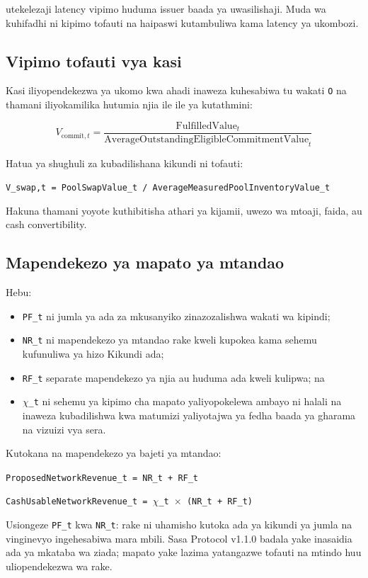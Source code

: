 \documentclass[11pt]{article}
\begin{document}
utekelezaji latency vipimo huduma issuer baada ya uwasilishaji. Muda wa kuhifadhi ni kipimo tofauti na haipaswi kutambuliwa kama latency ya ukombozi.

\subsection*{Vipimo tofauti vya kasi}

Kasi iliyopendekezwa ya ukomo kwa ahadi inaweza kuhesabiwa tu wakati \texttt{O} na thamani iliyokamilika hutumia njia ile ile ya kutathmini:

\[
V_{\mathrm{commit},t} = \frac{\mathrm{FulfilledValue}_t}{\mathrm{AverageOutstandingEligibleCommitmentValue}_t}
\]

Hatua ya shughuli za kubadilishana kikundi ni tofauti:

\texttt{V\_swap,t = PoolSwapValue\_t / AverageMeasuredPoolInventoryValue\_t}

Hakuna thamani yoyote kuthibitisha athari ya kijamii, uwezo wa mtoaji, faida, au cash convertibility.

\subsection*{Mapendekezo ya mapato ya mtandao}

Hebu:

\begin{itemize}[leftmargin=*]
\item \texttt{PF\_t} ni jumla ya ada za mkusanyiko zinazozalishwa wakati wa kipindi;
\item \texttt{NR\_t} ni mapendekezo ya mtandao rake kweli kupokea kama sehemu kufunuliwa ya hizo Kikundi ada;
\item \texttt{RF\_t} separate mapendekezo ya njia au huduma ada kweli kulipwa; na
\item \texttt{$\chi$\_t} ni sehemu ya kipimo cha mapato yaliyopokelewa ambayo ni halali na inaweza kubadilishwa kwa matumizi yaliyotajwa ya fedha baada ya gharama na vizuizi vya sera.
\end{itemize}
Kutokana na mapendekezo ya bajeti ya mtandao:

\texttt{ProposedNetworkRevenue\_t = NR\_t + RF\_t}

\texttt{CashUsableNetworkRevenue\_t = $\chi$\_t $\times$ (NR\_t + RF\_t)}

Usiongeze \texttt{PF\_t} kwa \texttt{NR\_t}: rake ni uhamisho kutoka ada ya kikundi ya jumla na vinginevyo ingehesabiwa mara mbili. Sasa Protocol v1.1.0 badala yake inasaidia ada ya mkataba wa ziada; mapato yake lazima yatangazwe tofauti na mtindo huu uliopendekezwa wa rake.
\end{document}
